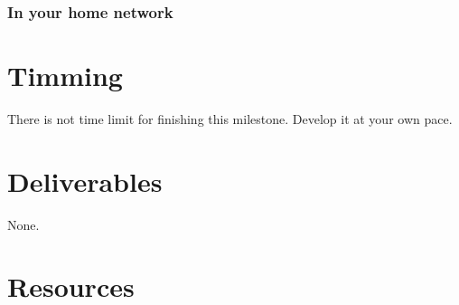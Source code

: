 \subsubsection{In your home network}

\section{Timming}

There is not time limit for finishing this milestone. Develop it at
your own pace.

\section{Deliverables}

None.

\section{Resources}


